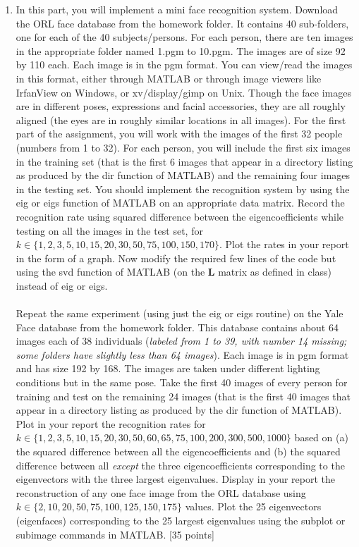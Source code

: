 \documentclass[11pt]{article}
\begin{document}
\begin{enumerate}

\item In this part, you will implement a mini face recognition system. Download the ORL face database from the homework folder. It contains 40 sub-folders, one for each of the 40 subjects/persons. For each person, there are ten images in the appropriate folder named 1.pgm to 10.pgm. The images are of size 92 by 110 each. Each image is in the pgm format. You can view/read the images in this format, either through MATLAB or through image viewers like IrfanView on Windows, or xv/display/gimp on Unix. Though the face images are in different poses, expressions and facial accessories, they are all roughly aligned (the eyes are in roughly similar locations in all images). For the first part of the assignment, you will work with the images of the first 32 people (numbers from 1 to 32). For each person, you will include the first six images in the training set (that is the first 6 images that appear in a directory listing as produced by the \textsf{dir} function of MATLAB) and the remaining four images in the testing set. You should implement the recognition system by using the \textsf{eig} or \textsf{eigs} function of MATLAB on an appropriate data matrix. Record the recognition rate using squared difference between the eigencoefficients while testing on all the images in the test set, for $k \in \{1,2,3,5,10,15,20,30,50,75,100,150,170\}$. Plot the rates in your report in the form of a graph. Now modify the required few lines of the code but using the \textsf{svd} function of MATLAB (on the $\boldsymbol{L}$ matrix as defined in class) instead of \textsf{eig} or \textsf{eigs}.
\\
\\
Repeat the same experiment (using just the \textsf{eig} or \textsf{eigs} routine) on the Yale Face database from the homework folder. This database contains about 64 images each of 38 individuals (\textit{labeled from 1 to 39, with number 14 missing; some folders have slightly less than 64 images}). Each image is in pgm format and has size 192 by 168. The images are taken under different lighting conditions but in the same pose. Take the first 40 images of every person for training and test on the remaining 24 images (that is the first 40 images that appear in a directory listing as produced by the \textsf{dir} function of MATLAB). Plot in your report the recognition rates for $k \in \{1,2,3,5,10,15,20,30,50,60, 65,75,100,200,300,500,1000\}$ based on (a) the squared difference between all the eigencoefficients and (b) the squared difference between all \emph{except} the three eigencoefficients corresponding to the eigenvectors with the three largest eigenvalues. Display in your report the reconstruction of any one face image from the ORL database using $k \in \{2,10,20,50,75,100,125, 150,175\}$ values. Plot the 25 eigenvectors (eigenfaces) corresponding to the 25 largest eigenvalues using the subplot or subimage commands in MATLAB. \textsf{[35 points]}


\end{enumerate}
\end{document}
